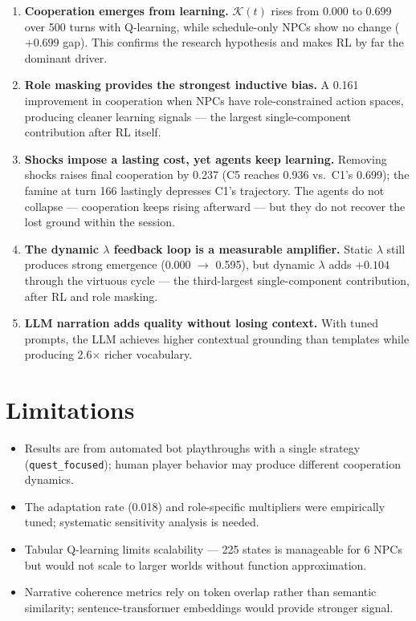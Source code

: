 \documentclass[12pt, a4paper, oneside]{report}
\begin{document}
\begin{enumerate}
    \item \textbf{Cooperation emerges from learning.} $\mathcal{K}(t)$ rises from 0.000 to 0.699 over 500 turns with Q-learning, while schedule-only NPCs show no change ($+0.699$ gap). This confirms the research hypothesis and makes RL by far the dominant driver.
    \item \textbf{Role masking provides the strongest inductive bias.} A 0.161 improvement in cooperation when NPCs have role-constrained action spaces, producing cleaner learning signals --- the largest single-component contribution after RL itself.
    \item \textbf{Shocks impose a lasting cost, yet agents keep learning.} Removing shocks raises final cooperation by 0.237 (C5 reaches 0.936 vs.\ C1's 0.699); the famine at turn 166 lastingly depresses C1's trajectory. The agents do not collapse --- cooperation keeps rising afterward --- but they do not recover the lost ground within the session.
    \item \textbf{The dynamic $\lambda$ feedback loop is a measurable amplifier.} Static $\lambda$ still produces strong emergence (0.000 $\to$ 0.595), but dynamic $\lambda$ adds $+0.104$ through the virtuous cycle --- the third-largest single-component contribution, after RL and role masking.
    \item \textbf{LLM narration adds quality without losing context.} With tuned prompts, the LLM achieves higher contextual grounding than templates while producing 2.6$\times$ richer vocabulary.
\end{enumerate}

\section{Limitations}
\label{sec:limitations}

\begin{itemize}[nosep]
    \item Results are from automated bot playthroughs with a single strategy (\texttt{quest\_focused}); human player behavior may produce different cooperation dynamics.
    \item The adaptation rate (0.018) and role-specific multipliers were empirically tuned; systematic sensitivity analysis is needed.
    \item Tabular Q-learning limits scalability --- 225 states is manageable for 6 NPCs but would not scale to larger worlds without function approximation.
    \item Narrative coherence metrics rely on token overlap rather than semantic similarity; sentence-transformer embeddings would provide stronger signal.
\end{itemize}
\end{document}
